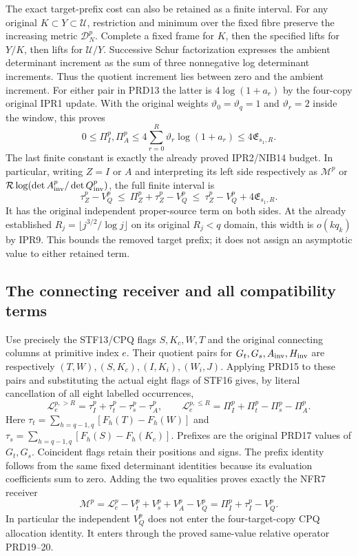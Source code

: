 \documentclass[11pt,a4paper]{article}
\begin{document}
The exact target-prefix cost can also be retained as a finite interval.
For any original $K\subset Y\subset\mathcal U$, restriction and
minimum over the fixed fibre preserve the increasing metric
$\mathcal D_N^p$. Complete a fixed frame for $K$, then the
specified lifts for $Y/K$, then lifts for $\mathcal U/Y$.
Successive Schur factorization expresses the ambient determinant
increment as the sum of three nonnegative log determinant
increments. Thus the quotient increment lies between zero and
the ambient increment. For either pair in PRD13 the latter is
$4\log(1+a_r)$ by the four-copy original IPR1 update. With
the original weights $\vartheta_0=\vartheta_q=1$ and
$\vartheta_r=2$ inside the window, this proves
\[
 0\le\Pi_I^p,\Pi_A^p
 \le4\sum_{r=0}^R\vartheta_r\log(1+a_r)
 \le4\mathfrak E_{s_1,R}.                              \tag{PRD23}
\]
The last finite constant is exactly the already proved IPR2/NIB14
budget. In particular, writing $Z=I$ or $A$ and interpreting its
left side respectively as $\mathcal M^p$ or
$\mathcal R\log(\det A_{\rm inv}^p/\det Q_{\rm inv}^p)$,
the full finite interval is
\[
 \tau_Z^p-V_Q^p\ \le\ \Pi_Z^p+\tau_Z^p-V_Q^p
       \ \le\ \tau_Z^p-V_Q^p+4\mathfrak E_{s_1,R}.       \tag{PRD24}
\]
It has the original independent proper-source term on both sides.
At the already established $R_j=\lfloor j^{3/2}/\log j\rfloor$
on its original $R_j<q$ domain, this width is $o(kq_k)$ by
IPR9. This bounds the removed target prefix; it does not assign
an asymptotic value to either retained term.

\subsection{The connecting receiver and all compatibility terms}
Use precisely the STF13/CPQ flags $S,K_c,W,T$ and the original
connecting columns at primitive index $e$. Their quotient pairs
for $G_t,G_s,A_{\rm inv},H_{\rm inv}$ are respectively
$(T,W),(S,K_c),(I,K_i),(W_i,J)$. Applying PRD15 to these pairs
and substituting the actual eight flags of STF16 gives, by
literal cancellation of all eight labelled occurrences,
\[
 \mathcal L_e^{p,>R}
  =\tau_I^p+\tau_t^p-\tau_s^p-\tau_A^p,\qquad
 \mathcal L_e^{p,\le R}
  =\Pi_I^p+\Pi_t^p-\Pi_s^p-\Pi_A^p.                    \tag{PRD25}
\]
Here $\tau_t=\sum_{h=q-1,q}[F_h(T)-F_h(W)]$ and
$\tau_s=\sum_{h=q-1,q}[F_h(S)-F_h(K_c)]$.
Prefixes are the original PRD17 values
of $G_t,G_s$. Coincident flags retain their positions and signs.
The prefix identity follows from the same fixed determinant
identities because its evaluation coefficients sum to zero.
Adding the two equalities proves exactly the NFR7 receiver
\[
 \mathcal M^p
 =\mathcal L_e^p-V_t^p+V_s^p+V_A^p-V_Q^p
 =\Pi_I^p+\tau_I^p-V_Q^p.                              \tag{PRD26}
\]
In particular the independent $V_Q^p$ does not enter the
four-target-copy CPQ allocation identity. It enters through the
proved same-value relative operator PRD19--20.
\end{document}

